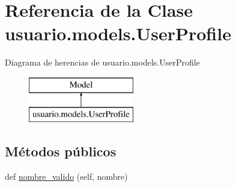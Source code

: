 \hypertarget{classusuario_1_1models_1_1_user_profile}{}\section{Referencia de la Clase usuario.\+models.\+User\+Profile}
\label{classusuario_1_1models_1_1_user_profile}
Diagrama de herencias de usuario.\+models.\+User\+Profile\begin{figure}[H]
\begin{center}
\leavevmode
\includegraphics[height=2.000000cm]{classusuario_1_1models_1_1_user_profile}
\end{center}
\end{figure}
\subsection*{Métodos públicos}
\begin{DoxyCompactItemize}
\item 
def \hyperlink{classusuario_1_1models_1_1_user_profile_af29e31145afb5a85129fc3f2895ba025}{nombre\+\_\+valido} (self, nombre)
\end{DoxyCompactItemize}

